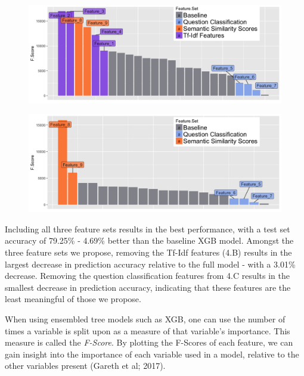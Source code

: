 \documentclass[letterpaper, 10 pt, conference]{ieeeconf}  %
\begin{document}
\begin{figure}[t]
\centering
\begin{minipage}{.5\textwidth}
  \centering
  \includegraphics[width=1\linewidth]{full_bars}
  \label{fig:test1}
\end{minipage}%
\begin{minipage}{.5\textwidth}
  \centering
  \includegraphics[width=1\linewidth]{no_tfidf_bars}
  \label{fig:test2}
\end{minipage}
\end{figure}

Including all three feature sets results in the best performance, with a test set accuracy of 79.25\% - 4.69\% better than the baseline XGB model. Amongst the three feature sets we propose, removing the Tf-Idf features (4.B) results in the largest decrease in prediction accuracy relative to the full model - with a 3.01\% decrease. Removing the question classification features from 4.C results in the smallest decrease in prediction accuracy, indicating that these features are the least meaningful of those we propose. 

When using ensembled tree models such as XGB, one can use the number of times a variable is split upon as a measure of that variable's importance. This measure is called the \emph{F-Score}. By plotting the F-Scores of each feature, we can gain insight into the importance of each variable used in a model, relative to the other variables present (Gareth et al; 2017).
\end{document}
